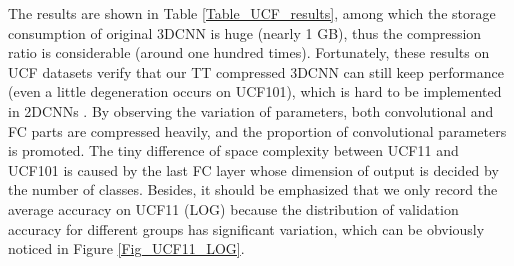 \documentclass[a4paper,fleqn]{cas-dc}
\begin{document}
The results are shown in Table \ref{Table_UCF_results}, among which the storage consumption of original 3DCNN is huge (nearly 1 GB), thus the compression ratio is considerable (around one hundred times). Fortunately, these results on UCF datasets verify that our TT compressed 3DCNN can still keep performance (even a little degeneration occurs on UCF101), which is hard to be implemented in 2DCNNs \citep{Garipov_2016_TTCNN}. By observing the variation of parameters, both convolutional and FC parts are compressed heavily, and the proportion of convolutional parameters is promoted. The tiny difference of space complexity between UCF11 and UCF101 is caused by the last FC layer whose dimension of output is decided by the number of classes. Besides, it should be emphasized that we only record the average accuracy on UCF11 (LOG) because the distribution of validation accuracy for different groups has significant variation, which can be obviously noticed in Figure \ref{Fig_UCF11_LOG}.
\end{document}
